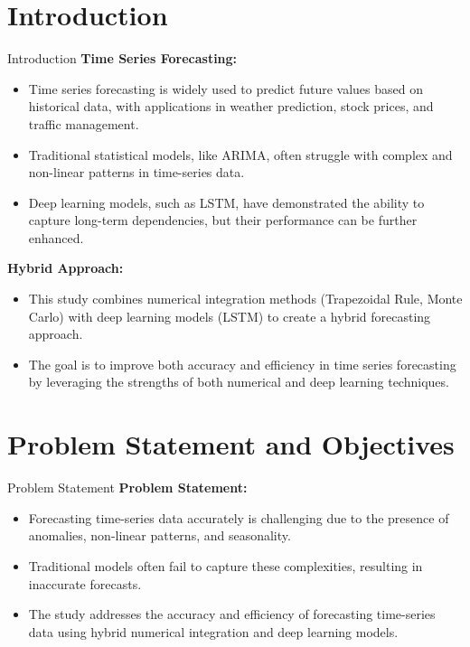 \documentclass[10pt]{beamer}
\begin{document}
\section{Introduction}
\begin{frame}{Introduction}
    \textbf{Time Series Forecasting:}
    \begin{itemize}
        \item Time series forecasting is widely used to predict future values based on historical data, with applications in weather prediction, stock prices, and traffic management.
        \item Traditional statistical models, like ARIMA, often struggle with complex and non-linear patterns in time-series data.
        \item Deep learning models, such as LSTM, have demonstrated the ability to capture long-term dependencies, but their performance can be further enhanced.
    \end{itemize}
    
    \textbf{Hybrid Approach:}
    \begin{itemize}
        \item This study combines numerical integration methods (Trapezoidal Rule, Monte Carlo) with deep learning models (LSTM) to create a hybrid forecasting approach.
        \item The goal is to improve both accuracy and efficiency in time series forecasting by leveraging the strengths of both numerical and deep learning techniques.
    \end{itemize}
\end{frame}

\section{Problem Statement and Objectives}
\begin{frame}{Problem Statement}
    \textbf{Problem Statement:}
    \begin{itemize}
        \item Forecasting time-series data accurately is challenging due to the presence of anomalies, non-linear patterns, and seasonality.
        \item Traditional models often fail to capture these complexities, resulting in inaccurate forecasts.
        \item The study addresses the accuracy and efficiency of forecasting time-series data using hybrid numerical integration and deep learning models.
    \end{itemize}
\end{frame}
\end{document}
